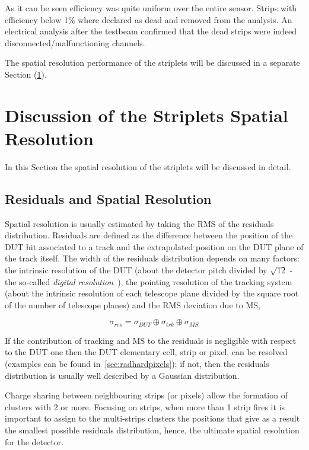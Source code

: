 As it can be seen efficiency was quite uniform
over the entire sensor. Strips with efficiency below 1\% where declared as dead and removed from the 
analysis. An electrical analysis after the testbeam confirmed that  the dead strips 
were indeed disconnected/malfunctioning channels. 

The spatial resolution performance of the striplets will be discussed in a separate Section (\ref{sec:striplets_res}).

\section{Discussion of the Striplets Spatial Resolution}
\label{sec:striplets_res}

In this Section the spatial resolution of the striplets will be discussed in detail. 

\subsection{Residuals and Spatial Resolution}

Spatial resolution is usually estimated by taking the RMS of the residuals distribution. Residuals are 
defined as the difference between the position of the DUT hit associated to a track and 
the extrapolated position on the DUT plane of the track itself. 
The width of the residuals distribution depends on many factors: the intrinsic resolution of the 
DUT (about the detector pitch divided by $\sqrt{12}$ - the so-called {\it digital resolution}~\cite{TURCHETTA}), the pointing resolution of the tracking system 
(about the intrinsic resolution of each telescope plane divided by the square root of the number of 
telescope planes) and the RMS deviation due to MS,

\begin{equation}
\sigma_{res}=\sigma_{DUT}\oplus\sigma_{trk}\oplus\sigma_{MS}
\label{eq:res}
\end{equation}

If the contribution of tracking and MS to the residuals is negligible with respect to the DUT 
one then the DUT elementary cell, strip or pixel, can be resolved (examples can be found 
in~\ref{sec:radhardpixels}); if not, then the residuals distribution 
is usually well described by a Gaussian distribution. 

Charge sharing between neighbouring strips (or pixels) allow the formation of clusters with 2 
or more. Focusing on strips, when more than 1 strip fires it is important to assign to the 
multi-strips clusters the positions that give as a result the smallest possible residuals distribution, 
hence, the ultimate spatial resolution for the detector. 


